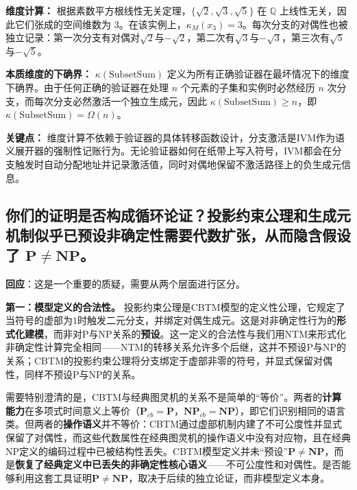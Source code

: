 \documentclass{ctexart}
\begin{document}
	\textbf{维度计算：} 根据素数平方根线性无关定理，$\{\sqrt{2}, \sqrt{3}, \sqrt{5}\}$ 在 $\mathbb{Q}$ 上线性无关，因此它们张成的空间维数为 $3$。在该实例上，$\kappa_M(x_3) = 3$。每次分支的对偶性也被独立记录：第一次分支有对偶对$\sqrt{2}$与$-\sqrt{2}$，第二次有$\sqrt{3}$与$-\sqrt{3}$，第三次有$\sqrt{5}$与$-\sqrt{5}$。
	
	\textbf{本质维度的下确界：} $\kappa(\mathrm{SubsetSum})$ 定义为所有正确验证器在最坏情况下的维度下确界。由于任何正确的验证器在处理 $n$ 个元素的子集和实例时必然经历 $n$ 次分支，而每次分支必然激活一个独立生成元，因此 $\kappa(\mathrm{SubsetSum}) \ge n$，即 $\kappa(\mathrm{SubsetSum}) = \Omega(n)$。
	
	\textbf{关键点：} 维度计算不依赖于验证器的具体转移函数设计，分支激活是IVM作为语义展开器的强制性记账行为。无论验证器如何在纸带上写入符号，IVM都会在分支触发时自动分配地址并记录激活值，同时对偶地保留不激活路径上的负生成元信息。
	
	
	\subsection{你们的证明是否构成循环论证？投影约束公理和生成元机制似乎已预设非确定性需要代数扩张，从而隐含假设了 $\mathbf{P} \neq \mathbf{NP}$。}
	
	\textbf{回应}：这是一个重要的质疑，需要从两个层面进行区分。
	
	\textbf{第一：模型定义的合法性。} 投影约束公理是CBTM模型的定义性公理，它规定了当符号的虚部为$1$时触发二元分支，并绑定对偶生成元。这是对非确定性行为的\textbf{形式化建模}，而非对P与NP关系的\textbf{预设}。这一定义的合法性与我们用NTM来形式化非确定性计算完全相同——NTM的转移关系允许多个后继，这并不预设P与NP的关系；CBTM的投影约束公理将分支绑定于虚部非零的符号，并显式保留对偶性，同样不预设P与NP的关系。
	
	需要特别澄清的是，CBTM与经典图灵机的关系不是简单的``等价''。两者的\textbf{计算能力}在多项式时间意义上等价（$\mathbf{P}_{cb}=\mathbf{P}$，$\mathbf{NP}_{cb}=\mathbf{NP}$），即它们识别相同的语言类。但两者的\textbf{操作语义}并不等价：CBTM通过虚部机制内建了不可公度性并显式保留了对偶性，而这些代数属性在经典图灵机的操作语义中没有对应物，且在经典NP定义的编码过程中已被结构性丢失。CBTM模型定义并未``预设''$\mathbf{P}\neq\mathbf{NP}$，而是\textbf{恢复了经典定义中已丢失的非确定性核心语义}——不可公度性和对偶性。是否能够利用这套工具证明$\mathbf{P}\neq\mathbf{NP}$，取决于后续的独立论证，而非模型定义本身。
	
\end{document}
